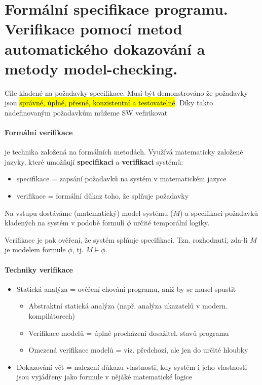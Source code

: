 \section[TVS - Formální specifikace programu, model checking]{Formální specifikace programu. Verifikace pomocí metod automatického dokazování a metody model-checking.}

Cíle kladené na požadavky specifikace. Musí být demonstrováno že požadavky jsou \hl{správné, úplné, přesné, konzistentní a testovatelné}. Díky takto nadefinovaným požadavkům můžeme SW vefirikovat

\paragraph{Formální verifikace} je technika založená na formálních metodách. Využívá matematicky založené jazyky, které umožňují \textbf{specifikaci} a \textbf{verifikaci} systémů:
\begin{itemize}[itemsep=0px]
\item specifikace = zapsání požadavků na systém v matematickém jazyce
\item verifikace = formální důkaz toho, že splňuje požadavky
\end{itemize}

Na vstupu dostáváme (matematický) model systému ($M$) a specifikaci požadavků kladených na systém v podobě formulí $\phi$ určité temporální logiky.

Verifikace je pak ověření, že systém splňuje specifikaci. Tzn. rozhodnutí, zda-li $M$ je modelem formule $\phi$, tj. $M \models \phi$.

\paragraph{Techniky verifikace}
\begin{itemize}[itemsep=0px]
\item Statická analýza = ověření chování programu, aniž by se musel spustit
    \begin{itemize}[itemsep=0px]
    \item Abstraktní statická analýza (např. analýza ukazatelů v modern. kompilátorech)
    \item Verifikace modelů = úplné procházení dosažitel. stavů programu
    \item Omezená verifikace modelů = viz. předchozí, ale jen do určité hloubky
    \end{itemize}
\item Dokazování vět = nalezení důkazu vlastnosti, kdy systém i jeho vlastnosti jsou vyjádřeny jako formule v nějáké matematické logice
\end{itemize}

